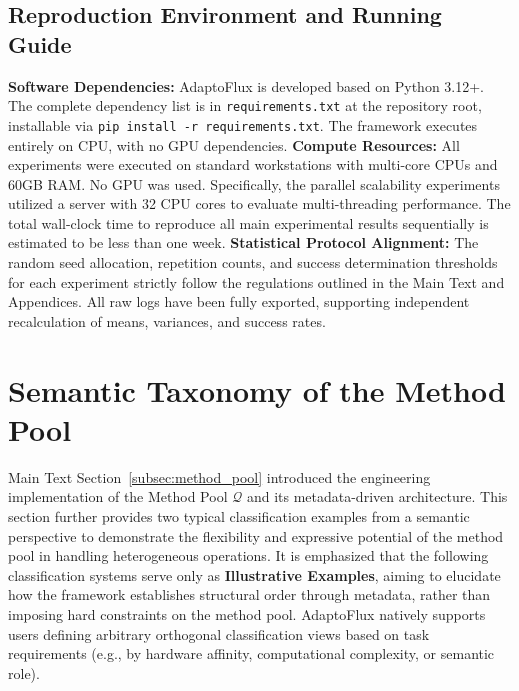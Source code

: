 \subsection{Reproduction Environment and Running Guide}
\noindent\textbf{Software Dependencies:} AdaptoFlux is developed based on Python 3.12+. The complete dependency list is in \texttt{requirements.txt} at the repository root, installable via \texttt{pip install -r requirements.txt}. The framework executes entirely on CPU, with no GPU dependencies.
\noindent\textbf{Compute Resources:} All experiments were executed on standard workstations with multi-core CPUs and 60GB RAM. No GPU was used. Specifically, the parallel scalability experiments utilized a server with 32 CPU cores to evaluate multi-threading performance. The total wall-clock time to reproduce all main experimental results sequentially is estimated to be less than one week.
\noindent\textbf{Statistical Protocol Alignment:} The random seed allocation, repetition counts, and success determination thresholds for each experiment strictly follow the regulations outlined in the Main Text and Appendices. All raw logs have been fully exported, supporting independent recalculation of means, variances, and success rates.


\section{Semantic Taxonomy of the Method Pool}
\label{app:method-pool-semantics}

Main Text Section~\ref{subsec:method_pool} introduced the engineering implementation of the Method Pool $\mathcal{Q}$ and its metadata-driven architecture. This section further provides two typical classification examples from a semantic perspective to demonstrate the flexibility and expressive potential of the method pool in handling heterogeneous operations. It is emphasized that the following classification systems serve only as \textbf{Illustrative Examples}, aiming to elucidate how the framework establishes structural order through metadata, rather than imposing hard constraints on the method pool. AdaptoFlux natively supports users defining arbitrary orthogonal classification views based on task requirements (e.g., by hardware affinity, computational complexity, or semantic role).

